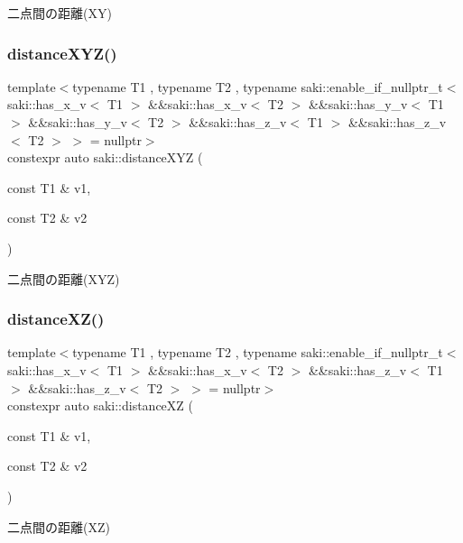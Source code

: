二点間の距離(\+X\+Y) 

\mbox{\label{namespacesaki_af202425b916b22c2b3a26731689d5c21}} 
\subsubsection{\texorpdfstring{distance\+X\+Y\+Z()}{distanceXYZ()}}
{\footnotesize\ttfamily template$<$typename T1 , typename T2 , typename saki\+::enable\+\_\+if\+\_\+nullptr\+\_\+t$<$ saki\+::has\+\_\+x\+\_\+v$<$ T1 $>$ \&\&saki\+::has\+\_\+x\+\_\+v$<$ T2 $>$ \&\&saki\+::has\+\_\+y\+\_\+v$<$ T1 $>$ \&\&saki\+::has\+\_\+y\+\_\+v$<$ T2 $>$ \&\&saki\+::has\+\_\+z\+\_\+v$<$ T1 $>$ \&\&saki\+::has\+\_\+z\+\_\+v$<$ T2 $>$ $>$  = nullptr$>$ \\
constexpr auto saki\+::distance\+X\+YZ (\begin{DoxyParamCaption}\item[{const T1 \&}]{v1,  }\item[{const T2 \&}]{v2 }\end{DoxyParamCaption})}



二点間の距離(\+X\+Y\+Z) 

\mbox{\label{namespacesaki_a6bd1999d77d0ba6f6101747d82593c66}} 
\subsubsection{\texorpdfstring{distance\+X\+Z()}{distanceXZ()}}
{\footnotesize\ttfamily template$<$typename T1 , typename T2 , typename saki\+::enable\+\_\+if\+\_\+nullptr\+\_\+t$<$ saki\+::has\+\_\+x\+\_\+v$<$ T1 $>$ \&\&saki\+::has\+\_\+x\+\_\+v$<$ T2 $>$ \&\&saki\+::has\+\_\+z\+\_\+v$<$ T1 $>$ \&\&saki\+::has\+\_\+z\+\_\+v$<$ T2 $>$ $>$  = nullptr$>$ \\
constexpr auto saki\+::distance\+XZ (\begin{DoxyParamCaption}\item[{const T1 \&}]{v1,  }\item[{const T2 \&}]{v2 }\end{DoxyParamCaption})}



二点間の距離(\+X\+Z) 


